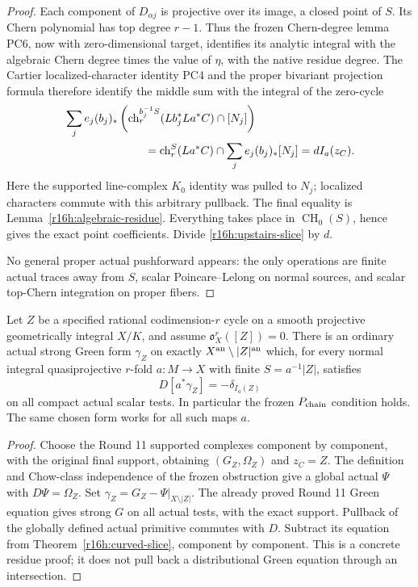 \begin{proof}
Each component of $D_{\alpha j}$ is projective over its image, a
closed point of $S$. Its Chern polynomial has top degree $r-1$.
Thus the frozen Chern-degree lemma PC6, now with zero-dimensional
target, identifies its analytic integral with the algebraic Chern
degree times the value of $\eta$, with the native residue degree.
The Cartier localized-character identity PC4 and the proper
bivariant projection formula therefore identify the middle sum with
the integral of the zero-cycle
\begin{align*}
 &\sum_j e_j(b_j)_*\left(
           \operatorname{ch}^{b_j^{-1}S}_r(Lb_j^*La^*C)\cap[N_j]\right)\\
 &\hspace{25mm}=\operatorname{ch}_r^S(La^*C)\cap
                    \sum_j e_j(b_j)_*[N_j]
       =d I_a(z_C).
\end{align*}
Here the supported line-complex $K_0$ identity was pulled to $N_j$;
localized characters commute with this arbitrary pullback. The final
equality is Lemma~\ref{r16h:algebraic-residue}. Everything takes place
in $\operatorname{CH}_0(S)$, hence gives the exact point coefficients.
Divide \eqref{r16h:upstairs-slice} by $d$.

No general proper actual pushforward appears: the only operations are
finite actual traces away from $S$, scalar Poincare--Lelong on normal
sources, and scalar top-Chern integration on proper fibers.
\end{proof}

\begin{corollary}
\label{r16h:P}
Let $Z$ be a specified rational codimension-$r$ cycle on a smooth
projective geometrically integral $X/K$, and assume
$\mathfrak o_X^r([Z])=0$. There is an ordinary actual strong Green form
$\gamma_Z$ on exactly $X^{\rm an}\setminus|Z|^{\rm an}$ which, for
every normal integral quasiprojective $r$-fold $a:M\to X$ with finite
$S=a^{-1}|Z|$, satisfies
\[
             D[a^*\gamma_Z]=-\delta_{I_a(Z)}
 \tag{H16.7}\label{r16h:P-eq}
\]
on all compact actual scalar tests. In particular the frozen
$P_{\rm chain}$ condition holds. The same chosen form works for all
such maps $a$.
\end{corollary}

\begin{proof}
Choose the Round 11 supported complexes component by component, with
the original final support, obtaining $(G_Z,\Omega_Z)$ and $z_C=Z$.
The definition and Chow-class independence of the frozen obstruction
give a global actual $\Psi$ with $D\Psi=\Omega_Z$. Set
$\gamma_Z=G_Z-\Psi|_{X\setminus|Z|}$. The already proved Round 11
Green equation gives strong $G$ on all actual tests, with the exact
support. Pullback of the globally defined actual primitive commutes
with $D$. Subtract its equation from
Theorem~\ref{r16h:curved-slice}, component by component.
This is a concrete residue proof; it does not pull back a distributional
Green equation through an intersection.
\end{proof}

